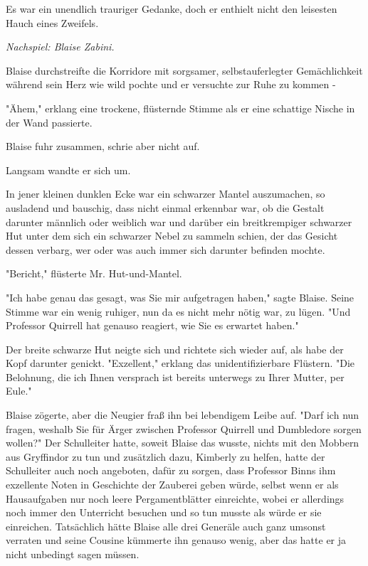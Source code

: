 {Es war ein unendlich trauriger Gedanke, doch er enthielt nicht den leisesten Hauch eines Zweifels.

\later

\emph{Nachspiel: Blaise Zabini.}

Blaise durchstreifte die Korridore mit sorgsamer, selbstauferlegter Gemächlichkeit während sein Herz wie wild pochte und er versuchte zur Ruhe zu kommen -

"Ähem," erklang eine trockene, flüsternde Stimme als er eine schattige Nische in der Wand passierte.

Blaise fuhr zusammen, schrie aber nicht auf.

Langsam wandte er sich um.

In jener kleinen dunklen Ecke war ein schwarzer Mantel auszumachen, so ausladend und bauschig, dass nicht einmal erkennbar war, ob die Gestalt darunter männlich oder weiblich war und darüber ein breitkrempiger schwarzer Hut unter dem sich ein schwarzer Nebel zu sammeln schien, der das Gesicht dessen verbarg, wer oder was auch immer sich darunter befinden mochte.

"Bericht," flüsterte Mr. Hut-und-Mantel.

"Ich habe genau das gesagt, was Sie mir aufgetragen haben," sagte Blaise. Seine Stimme war ein wenig ruhiger, nun da es nicht mehr nötig war, zu lügen. "Und Professor Quirrell hat genauso reagiert, wie Sie es erwartet haben."

Der breite schwarze Hut neigte sich und richtete sich wieder auf, als habe der Kopf darunter genickt. "Exzellent," erklang das unidentifizierbare Flüstern. "Die Belohnung, die ich Ihnen versprach ist bereits unterwegs zu Ihrer Mutter, per Eule."

Blaise zögerte, aber die Neugier fraß ihn bei lebendigem Leibe auf. "Darf ich nun fragen, weshalb Sie für Ärger zwischen Professor Quirrell und Dumbledore sorgen wollen?" Der Schulleiter hatte, soweit Blaise das wusste, nichts mit den Mobbern aus Gryffindor zu tun und zusätzlich dazu, Kimberly zu helfen, hatte der Schulleiter auch noch angeboten, dafür zu sorgen, dass Professor Binns ihm exzellente Noten in Geschichte der Zauberei geben würde, selbst wenn er als Hausaufgaben nur noch leere Pergamentblätter einreichte, wobei er allerdings noch immer den Unterricht besuchen und so tun musste als würde er sie einreichen. Tatsächlich hätte Blaise alle drei Generäle auch ganz umsonst verraten und seine Cousine kümmerte ihn genauso wenig, aber das hatte er ja nicht unbedingt sagen müssen.

}

